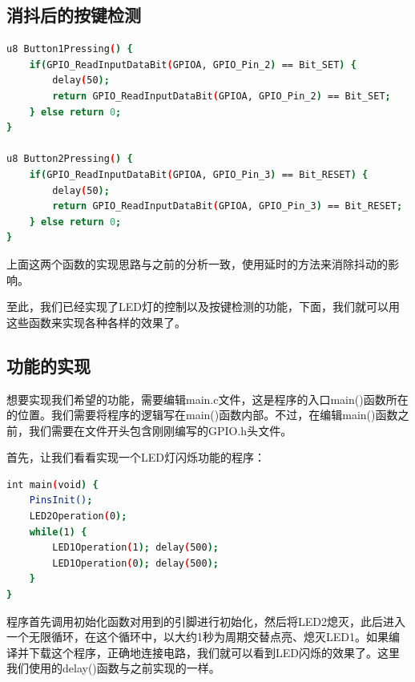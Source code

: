 	\subsection{消抖后的按键检测}
		\par 
		\begin{lstlisting}[language=bash, style=customStyleC, caption=消抖后的按键检测函数]
u8 Button1Pressing() {
	if(GPIO_ReadInputDataBit(GPIOA, GPIO_Pin_2) == Bit_SET) {
		delay(50);
		return GPIO_ReadInputDataBit(GPIOA, GPIO_Pin_2) == Bit_SET;
	} else return 0;
}

u8 Button2Pressing() {
	if(GPIO_ReadInputDataBit(GPIOA, GPIO_Pin_3) == Bit_RESET) {
		delay(50);
		return GPIO_ReadInputDataBit(GPIOA, GPIO_Pin_3) == Bit_RESET;
	} else return 0;
}
		\end{lstlisting}
		\par 
		上面这两个函数的实现思路与之前的分析一致，使用延时的方法来消除抖动的影响。
		\par 
		至此，我们已经实现了LED灯的控制以及按键检测的功能，下面，我们就可以用这些函数来实现各种各样的效果了。
	\subsection{功能的实现}
		想要实现我们希望的功能，需要编辑main.c文件，这是程序的入口main()函数所在的位置。我们需要将程序的逻辑写在main()函数内部。不过，在编辑main()函数之前，我们需要在文件开头包含刚刚编写的GPIO.h头文件。
		\par
		首先，让我们看看实现一个LED灯闪烁功能的程序：
		\par
		\begin{lstlisting}[language=bash, style=customStyleC, caption=LED灯闪烁]
int main(void) {
	PinsInit();
	LED2Operation(0);
	while(1) {
		LED1Operation(1); delay(500);
		LED1Operation(0); delay(500);
	}
}
		\end{lstlisting}
		\newpage
		\par 
		程序首先调用初始化函数对用到的引脚进行初始化，然后将LED2熄灭，此后进入一个无限循环，在这个循环中，以大约1秒为周期交替点亮、熄灭LED1。如果编译并下载这个程序，正确地连接电路，我们就可以看到LED闪烁的效果了。这里我们使用的delay()函数与之前实现的一样。

















